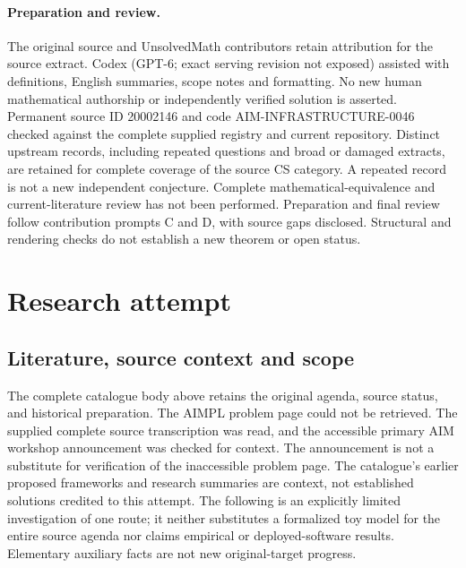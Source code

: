 \documentclass[11pt]{article}
\begin{document}
\paragraph{Preparation and review.}
The original source and UnsolvedMath contributors retain attribution for the source extract. Codex (GPT-6; exact serving revision not exposed) assisted with definitions, English summaries, scope notes and formatting. No new human mathematical authorship or independently verified solution is asserted. Permanent source ID 20002146 and code AIM-INFRASTRUCTURE-0046 checked against the complete supplied registry and current repository. Distinct upstream records, including repeated questions and broad or damaged extracts, are retained for complete coverage of the source CS category. A repeated record is not a new independent conjecture. Complete mathematical-equivalence and current-literature review has not been performed. Preparation and final review follow contribution prompts C and D, with source gaps disclosed. Structural and rendering checks do not establish a new theorem or open status.
\label{end:20002146}

\section{Research attempt}
\subsection{Literature, source context and scope}
The complete catalogue body above retains the original agenda, source status, and historical preparation. The AIMPL problem page could not be retrieved. The supplied complete source transcription was read, and the accessible primary AIM workshop announcement was checked for context. The announcement is not a substitute for verification of the inaccessible problem page. The catalogue's earlier proposed frameworks and research summaries are context, not established solutions credited to this attempt. The following is an explicitly limited investigation of one route; it neither substitutes a formalized toy model for the entire source agenda nor claims empirical or deployed-software results. Elementary auxiliary facts are not new original-target progress.
\end{document}
